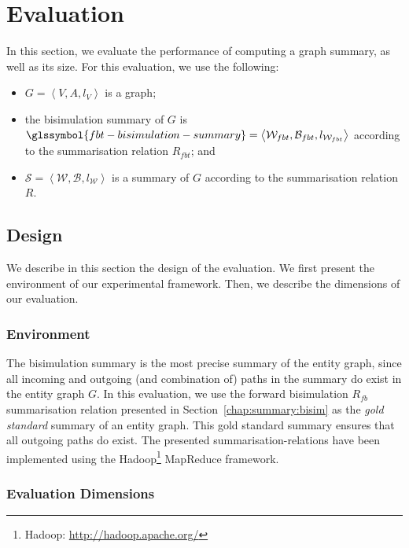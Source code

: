 \section{Evaluation}
\label{sec:summary:eval}

In this section, we evaluate the performance of computing a graph summary, as well as its size.
For this evaluation, we use the following:
\begin{itemize}
	\item $G=\left\langle V, A, l_V \right\rangle$ is a graph;
	\item the bisimulation summary of $G$ is $\glssymbol{fbt-bisimulation-summary} = \left\langle \mathcal{W}_{fbt}, \mathcal{B}_{fbt}, l_{\mathcal{W}_{fbt}} \right\rangle$ according to the summarisation relation $R_{fbt}$; and
	\item $\mathcal{S} = \left\langle \mathcal{W}, \mathcal{B}, l_{\mathcal{W}} \right\rangle$ is a summary of $G$ according to the summarisation relation $R$.
\end{itemize}

\subsection{Design}
\label{sec:eval:design}

We describe in this section the design of the evaluation. We first present the environment of our experimental framework. Then, we describe the dimensions of our evaluation.

\subsubsection{Environment}

The bisimulation summary  is the most precise summary of the entity graph, since all incoming and outgoing (and combination of) paths in the summary do exist in the entity graph $G$. In this evaluation, we use the forward bisimulation $R_{fb}$ summarisation relation presented in Section~\ref{chap:summary:bisim} as the \emph{gold standard} summary of an entity graph. This gold standard summary ensures that all outgoing paths do exist. The presented \glspl{summarisation-relation} have been implemented using the Hadoop\footnote{Hadoop: \url{http://hadoop.apache.org/}} MapReduce framework.

\subsubsection{Evaluation Dimensions}

